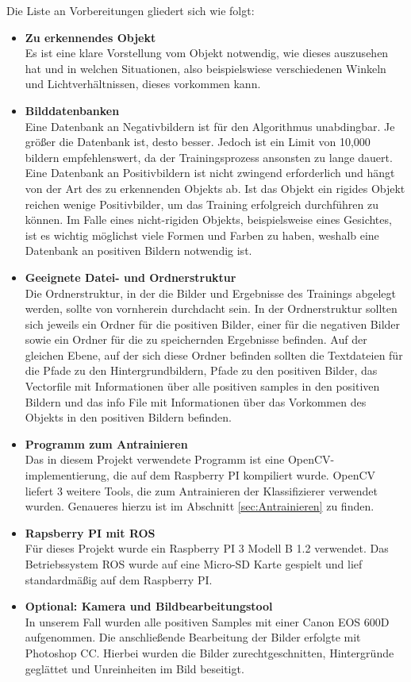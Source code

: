 Die Liste an Vorbereitungen gliedert sich wie folgt:
\begin{itemize}
\item[] \textbf{Zu erkennendes Objekt}\\ Es ist eine klare Vorstellung vom Objekt notwendig, wie dieses auszusehen hat und in welchen Situationen, also beispielswiese verschiedenen Winkeln und Lichtverhältnissen, dieses vorkommen kann.
\item[] \textbf{Bilddatenbanken}\\ Eine Datenbank an Negativbildern ist für den Algorithmus unabdingbar. Je größer die Datenbank ist, desto besser. Jedoch ist ein Limit von 10,000 bildern empfehlenswert, da der Trainingsprozess ansonsten zu lange dauert. Eine Datenbank an Positivbildern ist nicht zwingend erforderlich und hängt von der Art des zu erkennenden Objekts ab. Ist das Objekt ein rigides Objekt reichen wenige Positivbilder, um das Training erfolgreich durchführen zu können. Im Falle eines nicht-rigiden Objekts, beispielsweise eines Gesichtes, ist es wichtig möglichst viele Formen und Farben zu haben, weshalb eine Datenbank an positiven Bildern notwendig ist.
\item[] \textbf{Geeignete Datei- und Ordnerstruktur}\\ Die Ordnerstruktur, in der die Bilder und Ergebnisse des Trainings abgelegt werden, sollte von vornherein durchdacht sein. In der Ordnerstruktur sollten sich jeweils ein Ordner für die positiven Bilder, einer für die negativen Bilder sowie ein Ordner für die zu speichernden Ergebnisse befinden. Auf der gleichen Ebene, auf der sich diese Ordner befinden sollten die Textdateien für die Pfade zu den Hintergrundbildern, Pfade zu den positiven Bilder, das Vectorfile mit Informationen über alle positiven samples in den positiven Bildern und das info File mit Informationen über das Vorkommen des Objekts in den positiven Bildern befinden.
\item[] \textbf{Programm zum Antrainieren}\\ Das in diesem Projekt verwendete Programm ist eine OpenCV-implementierung, die auf dem Raspberry PI kompiliert wurde. OpenCV liefert 3 weitere Tools, die zum Antrainieren der Klassifizierer verwendet wurden. Genaueres hierzu ist im Abschnitt \ref{sec:Antrainieren} zu finden.
\item[] \textbf{Rapsberry PI mit ROS}\\ Für dieses Projekt wurde ein Raspberry PI 3 Modell B 1.2 verwendet. Das Betriebssystem ROS wurde auf eine Micro-SD Karte gespielt und lief standardmäßig auf dem Raspberry PI.
\item[] \textbf{Optional: Kamera und Bildbearbeitungstool}\\ In unserem Fall wurden alle positiven Samples mit einer Canon EOS 600D aufgenommen. Die anschließende Bearbeitung der Bilder erfolgte mit Photoshop CC. Hierbei wurden die Bilder zurechtgeschnitten, Hintergründe geglättet und Unreinheiten im Bild beseitigt.
\end{itemize}
